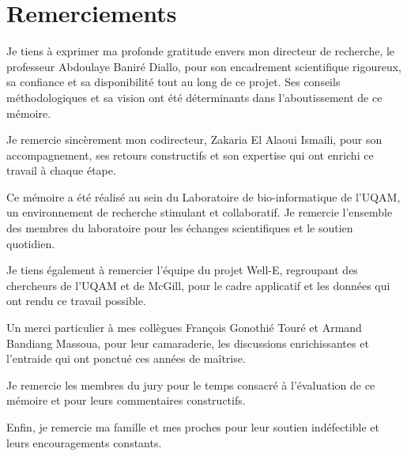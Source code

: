 \chapter*{Remerciements}

Je tiens à exprimer ma profonde gratitude envers mon directeur de recherche, le professeur
Abdoulaye Baniré Diallo, pour son encadrement scientifique rigoureux, sa confiance et sa
disponibilité tout au long de ce projet. Ses conseils méthodologiques et sa vision ont été
déterminants dans l'aboutissement de ce mémoire.

Je remercie sincèrement mon codirecteur, Zakaria El Alaoui Ismaili, pour son accompagnement,
ses retours constructifs et son expertise qui ont enrichi ce travail à chaque étape.

Ce mémoire a été réalisé au sein du Laboratoire de bio-informatique de l'UQAM, un
environnement de recherche stimulant et collaboratif. Je remercie l'ensemble des membres du
laboratoire pour les échanges scientifiques et le soutien quotidien.

Je tiens également à remercier l'équipe du projet Well-E, regroupant des chercheurs de
l'UQAM et de McGill, pour le cadre applicatif et les données qui ont rendu ce travail
possible.

Un merci particulier à mes collègues François Gonothié Touré et Armand Bandiang Massoua,
pour leur camaraderie, les discussions enrichissantes et l'entraide qui ont ponctué ces
années de maîtrise.

Je remercie les membres du jury pour le temps consacré à l'évaluation de ce mémoire et pour
leurs commentaires constructifs.

Enfin, je remercie ma famille et mes proches pour leur soutien indéfectible et leurs
encouragements constants.
